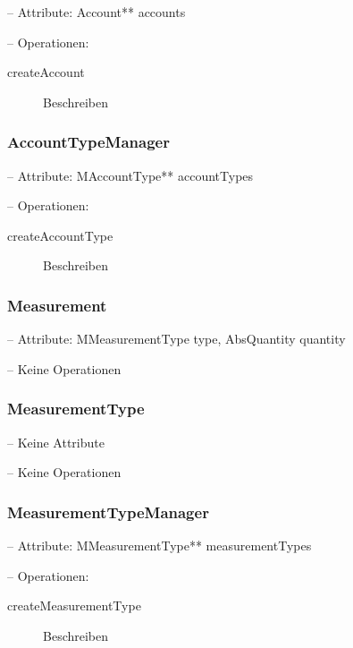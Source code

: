 
-- Attribute: Account** accounts

-- Operationen:

\begin{description}
	\item[createAccount] Beschreiben
\end{description}


\subsubsection{AccountTypeManager}


-- Attribute: MAccountType** accountTypes

-- Operationen:

\begin{description}
	\item[createAccountType] Beschreiben
\end{description}




\subsubsection{Measurement}


-- Attribute: MMeasurementType type, AbsQuantity quantity

-- Keine Operationen


\subsubsection{MeasurementType}


-- Keine Attribute

-- Keine Operationen


\subsubsection{MeasurementTypeManager}


-- Attribute: MMeasurementType** measurementTypes

-- Operationen:

\begin{description}
	\item[createMeasurementType] Beschreiben
\end{description}


